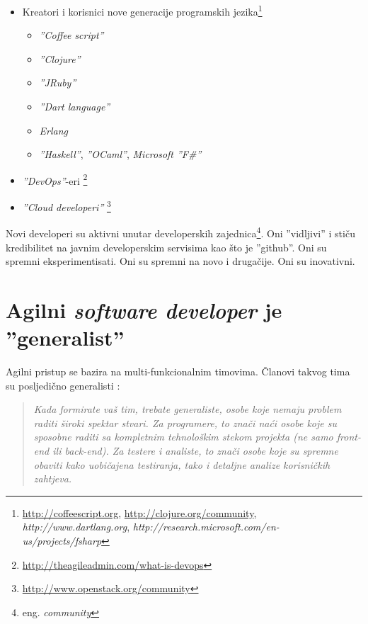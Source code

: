 \documentclass[times, utf8, seminar]{fit}
\begin{document}
\begin{itemize}
\begin{itemize}
                      \item \emph{''node.js'' community} \footnote{\url{http://nodejs.org/community}}
                 \end{itemize}
        \item Kreatori i korisnici nove generacije programskih jezika\footnote{\url{http://coffeescript.org}, \url{http://clojure.org/community}, \emph{http://www.dartlang.org}, \emph{http://research.microsoft.com/en-us/projects/fsharp}}
              \begin{itemize}
                 \item \emph{''Coffee script''}
                 \item  \emph{''Clojure''}
                 \item  \emph{''JRuby''}
                 \item  \emph{''Dart language''}
                 \item  \emph{Erlang}
                 \item  \emph{''Haskell''}, \emph{''OCaml''}, \emph{Microsoft ''F\#''}
               \end{itemize}
	\item \emph{''DevOps''}-eri \citep[str. 2]{agiletestdeploy}\footnote{\url{http://theagileadmin.com/what-is-devops}}
	\item \emph{''Cloud developeri''} \footnote{\url{http://www.openstack.org/community}}
\end{itemize}

Novi developeri su aktivni unutar developerskih zajednica\footnote{eng. \emph{community}}. Oni ''vidljivi'' i stiču kredibilitet na javnim developerskim servisima kao što je ''github''. Oni su spremni eksperimentisati. Oni su spremni na novo i drugačije. Oni su inovativni.

\section{Agilni \emph{software developer} je ''generalist''}

Agilni pristup se bazira na multi-funkcionalnim timovima. Članovi takvog tima su posljedično generalisti \citep[str. 19]{agilesamurai}:

\begin{quote}
\emph{Kada formirate vaš tim, trebate generaliste, osobe koje nemaju problem raditi široki spektar stvari. Za programere, to znači naći osobe koje su sposobne raditi sa kompletnim tehnološkim stekom projekta (ne samo front-end ili back-end). Za testere i analiste, to znači osobe koje su spremne obaviti kako uobičajena testiranja, tako i detaljne analize korisničkih zahtjeva.}
\end{quote}
\end{document}
